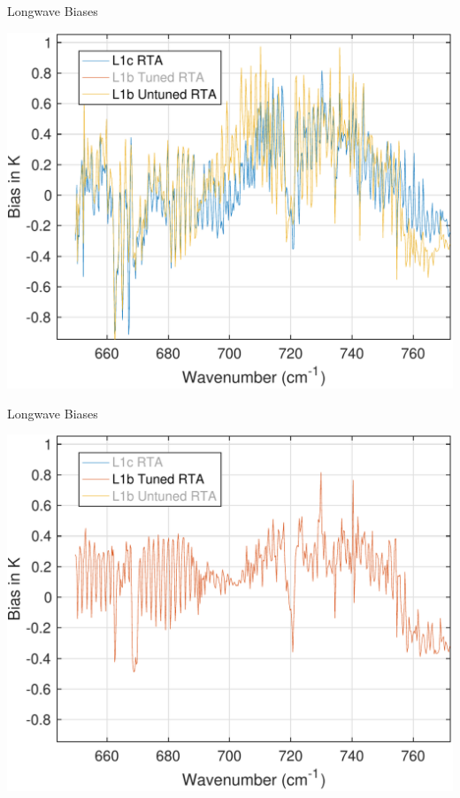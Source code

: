 \documentclass[10pt,t]{beamer}
\begin{document}
\begin{frame}[label={sec:org87db84f},noframenumbering]{Longwave Biases}
\begin{center}
\includegraphics[width=0.75\linewidth]{./Talk2/bias_3rta_lw_noL1btuning.pdf}
\end{center}
\end{frame}

\begin{frame}[label={sec:org2af980b},noframenumbering]{Longwave Biases}
\begin{center}
\includegraphics[width=0.75\linewidth]{./Talk2/bias_3rta_lw_justL1btuning.pdf}
\end{center}
\end{frame}
\end{document}

